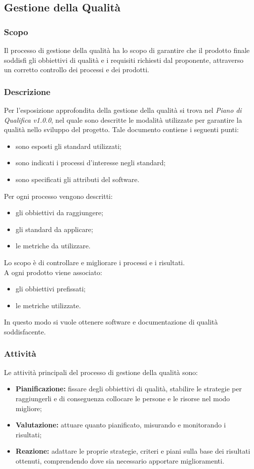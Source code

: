 \subsection{Gestione della Qualità}
\subsubsection{Scopo}
Il processo di gestione della qualità ha lo scopo di garantire che il prodotto finale soddisfi gli obbiettivi di qualità e i requisiti richiesti dal proponente, attraverso un corretto controllo dei processi e dei prodotti.
\subsubsection{Descrizione}
Per l'esposizione approfondita della gestione della qualità si trova nel \emph{Piano di Qualifica v1.0.0}, nel quale sono descritte le modalità utilizzate per garantire la qualità nello sviluppo del progetto. Tale documento contiene i seguenti punti:
\begin{itemize}
    \item sono esposti gli standard utilizzati;
    \item sono indicati i processi d'interesse negli standard;
    \item sono specificati gli attributi del software.
\end{itemize}
Per ogni processo vengono descritti:
\begin{itemize}
    \item gli obbiettivi da raggiungere;
    \item gli standard da applicare;
    \item le metriche da utilizzare.
\end{itemize}
Lo scopo è di controllare e migliorare i processi e i risultati. \\
A ogni prodotto viene associato:
\begin{itemize}
    \item gli obbiettivi prefissati;
    \item le metriche utilizzate.
\end{itemize}
In questo modo si vuole ottenere software e documentazione di qualità soddisfacente.
\subsubsection{Attività}
Le attività principali del processo di gestione della qualità sono:
\begin{itemize}
    \item \textbf{Pianificazione:} fissare degli obbiettivi di qualità, stabilire le strategie per raggiungerli e di conseguenza collocare le persone e le risorse nel modo migliore;
    \item \textbf{Valutazione:} attuare quanto pianificato, misurando e monitorando i risultati;
    \item \textbf{Reazione:} adattare le proprie strategie, criteri e piani sulla base dei risultati ottenuti, comprendendo dove sia necessario apportare miglioramenti.
\end{itemize}
